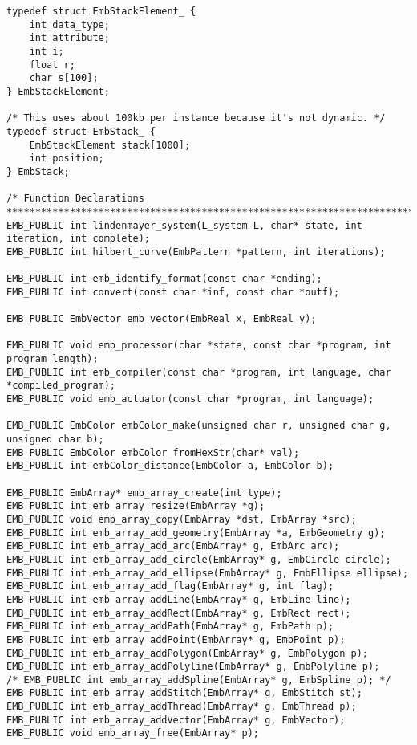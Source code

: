 \begin{verbatim}
typedef struct EmbStackElement_ {
    int data_type;
    int attribute;
    int i;
    float r;
    char s[100];
} EmbStackElement;

/* This uses about 100kb per instance because it's not dynamic. */
typedef struct EmbStack_ {
    EmbStackElement stack[1000];
    int position;
} EmbStack;

/* Function Declarations
*****************************************************************************/
EMB_PUBLIC int lindenmayer_system(L_system L, char* state, int iteration, int complete);
EMB_PUBLIC int hilbert_curve(EmbPattern *pattern, int iterations);

EMB_PUBLIC int emb_identify_format(const char *ending);
EMB_PUBLIC int convert(const char *inf, const char *outf);

EMB_PUBLIC EmbVector emb_vector(EmbReal x, EmbReal y);

EMB_PUBLIC void emb_processor(char *state, const char *program, int program_length);
EMB_PUBLIC int emb_compiler(const char *program, int language, char *compiled_program);
EMB_PUBLIC void emb_actuator(const char *program, int language);

EMB_PUBLIC EmbColor embColor_make(unsigned char r, unsigned char g, unsigned char b);
EMB_PUBLIC EmbColor embColor_fromHexStr(char* val);
EMB_PUBLIC int embColor_distance(EmbColor a, EmbColor b);

EMB_PUBLIC EmbArray* emb_array_create(int type);
EMB_PUBLIC int emb_array_resize(EmbArray *g);
EMB_PUBLIC void emb_array_copy(EmbArray *dst, EmbArray *src);
EMB_PUBLIC int emb_array_add_geometry(EmbArray *a, EmbGeometry g);
EMB_PUBLIC int emb_array_add_arc(EmbArray* g, EmbArc arc);
EMB_PUBLIC int emb_array_add_circle(EmbArray* g, EmbCircle circle);
EMB_PUBLIC int emb_array_add_ellipse(EmbArray* g, EmbEllipse ellipse);
EMB_PUBLIC int emb_array_add_flag(EmbArray* g, int flag);
EMB_PUBLIC int emb_array_addLine(EmbArray* g, EmbLine line);
EMB_PUBLIC int emb_array_addRect(EmbArray* g, EmbRect rect);
EMB_PUBLIC int emb_array_addPath(EmbArray* g, EmbPath p);
EMB_PUBLIC int emb_array_addPoint(EmbArray* g, EmbPoint p);
EMB_PUBLIC int emb_array_addPolygon(EmbArray* g, EmbPolygon p);
EMB_PUBLIC int emb_array_addPolyline(EmbArray* g, EmbPolyline p);
/* EMB_PUBLIC int emb_array_addSpline(EmbArray* g, EmbSpline p); */
EMB_PUBLIC int emb_array_addStitch(EmbArray* g, EmbStitch st);
EMB_PUBLIC int emb_array_addThread(EmbArray* g, EmbThread p);
EMB_PUBLIC int emb_array_addVector(EmbArray* g, EmbVector);
EMB_PUBLIC void emb_array_free(EmbArray* p);


\end{verbatim}
